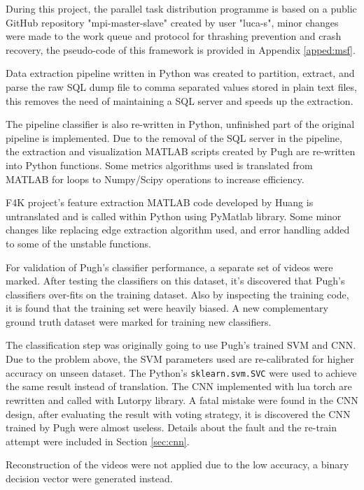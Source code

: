 \documentclass[bsc,logo,twoside,fullspacing,parskip]{infthesis}
\begin{document}
During this project, the parallel task distribution programme is based on a public GitHub repository "mpi-master-slave" created by user "luca-s"\cite{L5}, minor changes were made to the work queue and protocol for thrashing prevention and crash recovery, the pseudo-code of this framework is provided in Appendix \ref{apped:msf}.

Data extraction pipeline written in Python was created to partition, extract, and parse the raw SQL dump file to comma separated values stored in plain text files, this removes the need of maintaining a SQL server and speeds up the extraction. 

The pipeline classifier is also re-written in Python, unfinished part of the original pipeline is implemented. 
Due to the removal of the SQL server in the pipeline, the extraction and visualization MATLAB scripts created by Pugh are re-written into Python functions. 
Some metrics algorithms used is translated from MATLAB for loops to Numpy/Scipy operations to increase efficiency.

F4K project's feature extraction MATLAB code developed by Huang\cite{Huang} is untranslated and is called within Python using PyMatlab library. Some minor changes like replacing edge extraction algorithm used, and error handling added to some of the unstable functions. 

For validation of Pugh's classifier performance, a separate set of videos were marked. After testing the classifiers on this dataset, it's discovered that Pugh's classifiers over-fits on the training dataset. Also by inspecting the training code, it is found that the training set were heavily biased. A new complementary ground truth dataset were marked for training new classifiers. 

The classification step was originally going to use Pugh's trained SVM and CNN. Due to the problem above, the SVM parameters used are re-calibrated for higher accuracy on unseen dataset. 
The Python's {\tt sklearn.svm.SVC} were used to achieve the same result instead of translation. The CNN implemented with lua torch are rewritten and called with Lutorpy library.
A fatal mistake were found in the CNN design, after evaluating the result with voting strategy, it is discovered the CNN trained by Pugh were almost useless. Details about the fault and the re-train attempt were included in Section \ref{sec:cnn}.

Reconstruction of the videos were not applied due to the low accuracy, a binary decision vector were generated instead.
\end{document}
